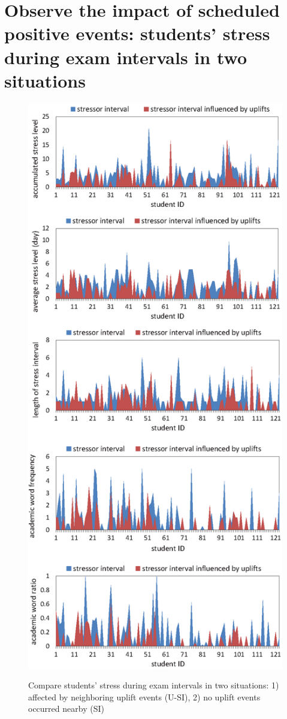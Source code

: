 \appendix
\section{Observe the impact of scheduled positive events: students' stress during exam intervals in two situations}
\begin{figure}
\centering
\caption{Compare students' stress during exam intervals in two situations:
1) affected by neighboring uplift events (U-SI), 2) no uplift events occurred nearby (SI)}
\includegraphics[width=\linewidth]{figs/frequency.eps}
\label{fig:frequency}
\end{figure}


